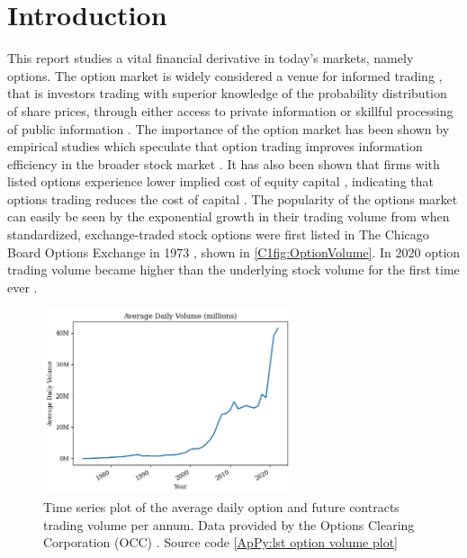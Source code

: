 \chapter{Introduction}

This report studies a vital financial derivative in today's markets, namely options. The option market is widely considered a venue for informed trading \cite{li2021effect,hu2014,chak2004}, that is investors trading with superior knowledge of the probability distribution of share prices, through either access to private information or skillful processing of public information \cite{grossman1975application}. 
\nline
The importance of the option market has been shown by empirical studies which speculate that option trading improves information efficiency in the broader stock market \cite{PanInfoEffic,li2021effect}. It has also been shown that firms with listed options experience lower implied cost of equity capital \cite{naikerLowEquity}, indicating that options trading reduces the cost of capital \cite{li2021effect}. The popularity of the options market can easily be seen by the exponential growth in their trading volume from when standardized, exchange-traded stock options were first listed in The Chicago Board Options Exchange in 1973 \cite{markham2002financial}, shown in \autoref{C1fig:OptionVolume}. In 2020 option trading volume became higher than the underlying stock volume for the first time ever \cite{yahooOptions}.

\begin{figure}[H]
    \centering
    \includegraphics[width=0.65\textwidth]{Chapters/C1/plots/OptionVolume.png}
    \caption{Time series plot of the average daily option and future contracts trading volume per annum. Data provided by the Options Clearing Corporation (OCC) \cite{THEOCC}. Source code \autoref{ApPy:lst option volume plot}}
    \label{C1fig:OptionVolume}
\end{figure}

